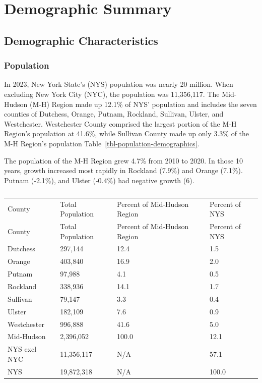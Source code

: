 \documentclass[
  english,
  letterpaper,
]{report}
\begin{document}

\chapter{Demographic Summary}\label{demographic-summary}

\section{Demographic Characteristics}\label{demographic-characteristics}

\subsection{Population}\label{population}

In 2023, New York State's (NYS) population was nearly 20 million. When
excluding New York City (NYC), the population was 11,356,117. The
Mid-Hudson (M-H) Region made up 12.1\% of NYS' population and includes
the seven counties of Dutchess, Orange, Putnam, Rockland, Sullivan,
Ulster, and Westchester. Westchester County comprised the largest
portion of the M-H Region's population at 41.6\%, while Sullivan County
made up only 3.3\% of the M-H Region's population
Table~\ref{tbl-population-demographics}.

The population of the M-H Region grew 4.7\% from 2010 to 2020. In those
10 years, growth increased most rapidly in Rockland (7.9\%) and Orange
(7.1\%). Putnam (-2.1\%), and Ulster (-0.4\%) had negative growth (6).

\begin{longtable}[]{@{}llll@{}}

\caption{\label{tbl-population-demographics}Population Demographic
Characteristics, 2023}

\tabularnewline

\caption{}\label{T_a2ede}\tabularnewline
\toprule\noalign{}
County & Total Population & Percent of Mid-Hudson Region & Percent of
NYS \\
\midrule\noalign{}
\endfirsthead
\toprule\noalign{}
County & Total Population & Percent of Mid-Hudson Region & Percent of
NYS \\
\midrule\noalign{}
\endhead
\bottomrule\noalign{}
\endlastfoot
Dutchess & 297,144 & 12.4 & 1.5 \\
Orange & 403,840 & 16.9 & 2.0 \\
Putnam & 97,988 & 4.1 & 0.5 \\
Rockland & 338,936 & 14.1 & 1.7 \\
Sullivan & 79,147 & 3.3 & 0.4 \\
Ulster & 182,109 & 7.6 & 0.9 \\
Westchester & 996,888 & 41.6 & 5.0 \\
Mid-Hudson & 2,396,052 & 100.0 & 12.1 \\
NYS excl NYC & 11,356,117 & N/A & 57.1 \\
NYS & 19,872,318 & N/A & 100.0 \\

\end{longtable}
\end{document}
